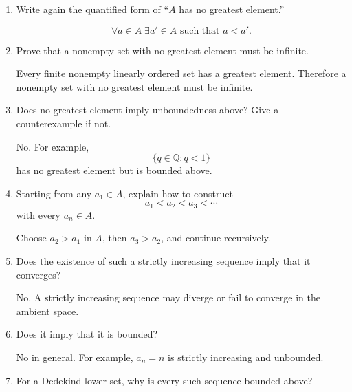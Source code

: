 \documentclass{essay}
\begin{document}
\begin{enumerate}[label=\arabic*., itemsep=10pt]

\item Write again the quantified form of ``$A$ has no greatest element.''

\begin{answer}
\[
\forall a\in A\;\exists a'\in A\text{ such that }a<a'.
\]
\end{answer}

\item Prove that a nonempty set with no greatest element must be infinite.

\begin{answer}
Every finite nonempty linearly ordered set has a greatest element. Therefore a nonempty set with no greatest element must be infinite.
\end{answer}

\item Does no greatest element imply unboundedness above? Give a counterexample if not.

\begin{answer}
No. For example,
\[
\{q\in\mathbb{Q}:q<1\}
\]
has no greatest element but is bounded above.
\end{answer}

\item Starting from any $a_1\in A$, explain how to construct
\[
a_1<a_2<a_3<\cdots
\]
with every $a_n\in A$.

\begin{answer}
Choose $a_2>a_1$ in $A$, then $a_3>a_2$, and continue recursively.
\end{answer}

\item Does the existence of such a strictly increasing sequence imply that it converges?

\begin{answer}
No. A strictly increasing sequence may diverge or fail to converge in the ambient space.
\end{answer}

\item Does it imply that it is bounded?

\begin{answer}
No in general. For example, $a_n=n$ is strictly increasing and unbounded.
\end{answer}

\item For a Dedekind lower set, why is every such sequence bounded above?


\end{enumerate}
\end{document}
